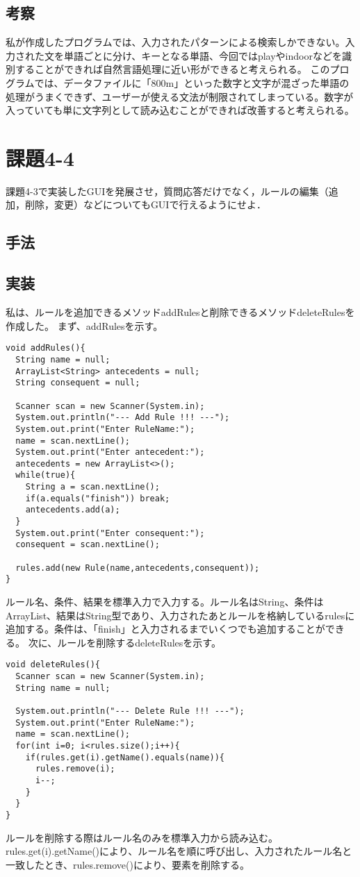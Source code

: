 \documentclass[a4j]{jarticle}
\begin{document}
\subsection{考察}
私が作成したプログラムでは、入力されたパターンによる検索しかできない。入力された文を単語ごとに分け、キーとなる単語、今回ではplayやindoorなどを識別することができれば自然言語処理に近い形ができると考えられる。
このプログラムでは、データファイルに「800m」といった数字と文字が混ざった単語の処理がうまくできず、ユーザーが使える文法が制限されてしまっている。数字が入っていても単に文字列として読み込むことができれば改善すると考えられる。

\section{課題4-4}
\begin{screen}
課題4-3で実装したGUIを発展させ，質問応答だけでなく，ルールの編集（追加，削除，変更）などについてもGUIで行えるようにせよ．
\end{screen}

\subsection{手法}

\subsection{実装}
私は、ルールを追加できるメソッドaddRulesと削除できるメソッドdeleteRulesを作成した。
まず、addRulesを示す。
\begin{lstlisting}[caption=addRulesメソッド]
void addRules(){
  String name = null;
  ArrayList<String> antecedents = null;
  String consequent = null;

  Scanner scan = new Scanner(System.in);
  System.out.println("--- Add Rule !!! ---");
  System.out.print("Enter RuleName:");
  name = scan.nextLine();
  System.out.print("Enter antecedent:");
  antecedents = new ArrayList<>();
  while(true){
    String a = scan.nextLine();
    if(a.equals("finish")) break;
    antecedents.add(a);
  }
  System.out.print("Enter consequent:");
  consequent = scan.nextLine();

  rules.add(new Rule(name,antecedents,consequent));
}
\end{lstlisting}
ルール名、条件、結果を標準入力で入力する。ルール名はString、条件はArrayList、結果はString型であり、入力されたあとルールを格納しているrulesに追加する。条件は、「finish」と入力されるまでいくつでも追加することができる。
次に、ルールを削除するdeleteRulesを示す。
\begin{lstlisting}[caption=deleteRulesメソッド]
void deleteRules(){
  Scanner scan = new Scanner(System.in);
  String name = null;

  System.out.println("--- Delete Rule !!! ---");
  System.out.print("Enter RuleName:");
  name = scan.nextLine();
  for(int i=0; i<rules.size();i++){
    if(rules.get(i).getName().equals(name)){
      rules.remove(i);
      i--;
    }
  }
}
\end{lstlisting}
ルールを削除する際はルール名のみを標準入力から読み込む。rules.get(i).getName()により、ルール名を順に呼び出し、入力されたルール名と一致したとき、rules.remove()により、要素を削除する。
\end{document}
